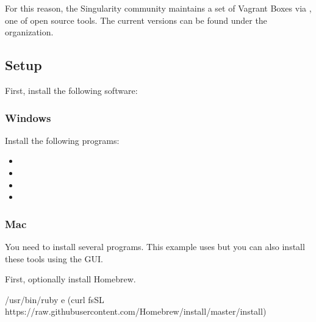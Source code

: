 \documentclass[letterpaper,10pt,english]{sphinxmanual}
\begin{document}
For this reason, the Singularity community maintains a set of Vagrant Boxes via
, one of  open source tools. The current
versions can be found under the 
organization.


\subsection{Setup}
\label{\detokenize{installation:setup}}
First, install the following software:


\subsubsection{Windows}
\label{\detokenize{installation:windows}}
Install the following programs:
\begin{itemize}
\item {} 

\item {} 

\item {} 

\item {} 

\end{itemize}


\subsubsection{Mac}
\label{\detokenize{installation:mac}}
You need to install several programs. This example uses  but you can also install these tools using the GUI.

First, optionally install Homebrew.

%
\begin{sphinxVerbatim}[commandchars=\\\{\}]
/usr/bin/ruby \PYGZhy{}e \PYGZdq{}\PYGZdl{}(curl \PYGZhy{}fsSL https://raw.githubusercontent.com/Homebrew/install/master/install)\PYGZdq{}
\end{sphinxVerbatim}
\end{document}
